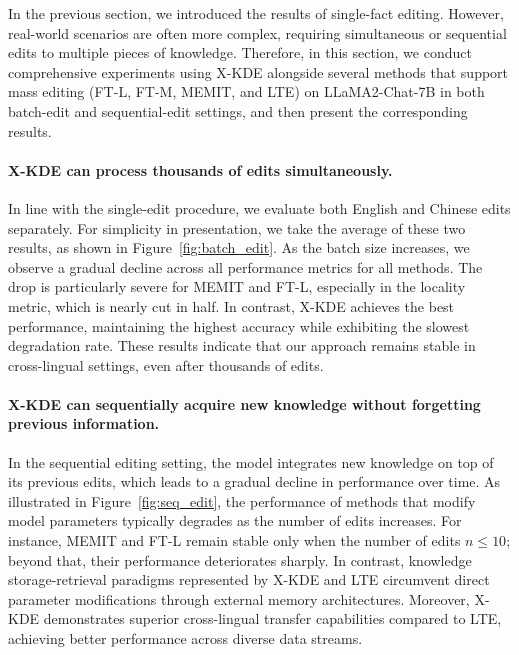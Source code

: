 In the previous section, we introduced the results of single-fact editing. However, real-world scenarios are often more complex, requiring simultaneous or sequential edits to multiple pieces of knowledge. Therefore, in this section, we conduct comprehensive experiments using X-KDE alongside several methods that support mass editing (FT-L, FT-M, MEMIT, and LTE) on LLaMA2-Chat-7B in both batch-edit and sequential-edit settings, and then present the corresponding results.

\paragraph{X-KDE can process thousands of edits simultaneously.} 
In line with the single-edit procedure, we evaluate both English and Chinese edits separately. For simplicity in presentation, we take the average of these two results, as shown in Figure~\ref{fig:batch_edit}. As the batch size increases, we observe a gradual decline across all performance metrics for all methods. The drop is particularly severe for MEMIT and FT-L, especially in the locality metric, which is nearly cut in half. In contrast, X-KDE achieves the best performance, maintaining the highest accuracy while exhibiting the slowest degradation rate. These results indicate that our approach remains stable in cross-lingual settings, even after thousands of edits.

\paragraph{X-KDE can sequentially acquire new knowledge without forgetting previous information.} 
In the sequential editing setting, the model integrates new knowledge on top of its previous edits, which leads to a gradual decline in performance over time. As illustrated in Figure~\ref{fig:seq_edit}, the performance of methods that modify model parameters typically degrades as the number of edits increases. For instance, MEMIT and FT-L remain stable only when the number of edits $n\le 10$; beyond that, their performance deteriorates sharply. In contrast, knowledge storage-retrieval paradigms represented by X-KDE and LTE circumvent direct parameter modifications through external memory architectures. Moreover, X-KDE demonstrates superior cross-lingual transfer capabilities compared to LTE, achieving better performance across diverse data streams.


